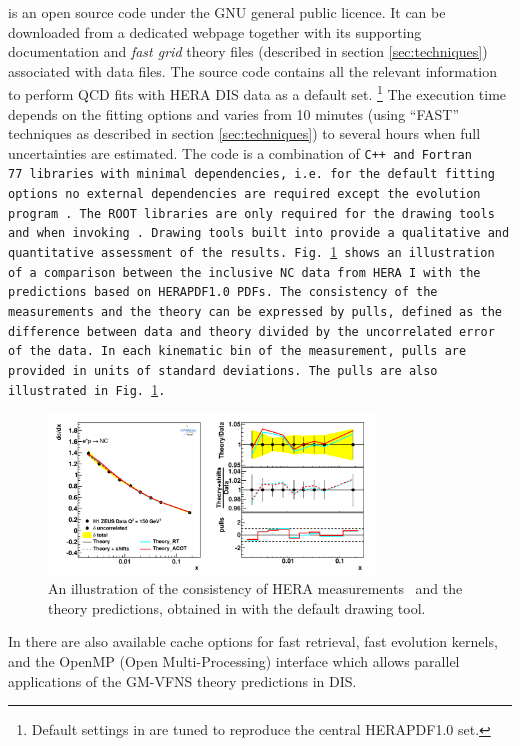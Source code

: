 
\fitter is an open source code under the GNU general public licence. It can be downloaded from a dedicated 
webpage \cite{herafitter:page}
together with its supporting documentation and 
\emph{fast grid} theory files (described in section \ref{sec:techniques}) associated with data files.
The source code contains all the relevant information to perform QCD fits with HERA DIS data as a default 
set. \footnote{Default settings in \fitter are tuned to reproduce the central HERAPDF1.0 set.} 
The execution time depends on the fitting options and varies from 10 minutes 
(using ``FAST'' techniques as described in section \ref{sec:techniques}) to several hours when 
full uncertainties are estimated. The \fitter code is a combination of \tt C++ \rm and \tt Fortran 77\rm \ libraries with minimal 
dependencies, i.e. for the default fitting options no external dependencies are required except the \qcdnum evolution program \cite{qcdnum}.
The \tt ROOT \rm  libraries are only required for the drawing tools and when invoking \applgrid.  
Drawing tools built into \fitter provide a qualitative and quantitative assessment of the results.
Fig.~\ref{fig:data} shows an illustration of a comparison between the inclusive NC data from HERA I
with the predictions based on HERAPDF1.0 PDFs.
The consistency of the measurements and the theory can be expressed by pulls, defined as the difference between data and theory divided by the uncorrelated error of the data. 
In each kinematic bin of the measurement, pulls are provided in units of standard deviations.  
The pulls are also illustrated in Fig.~\ref{fig:data}.
\begin{figure}[!ht]
   \centering
   \includegraphics[width=8.65cm]{datatheory.pdf}
   \caption{An illustration of the consistency of HERA measurements~\cite{h1zeus:2009wt} and the theory predictions, 
       obtained in \fitter with the default drawing tool.} 
 \label{fig:data}
\end{figure}


In \fitter there are also available cache options for fast retrieval, fast evolution kernels, and the OpenMP (Open Multi-Processing) 
interface which allows parallel applications of the GM-VFNS theory predictions in DIS. 


